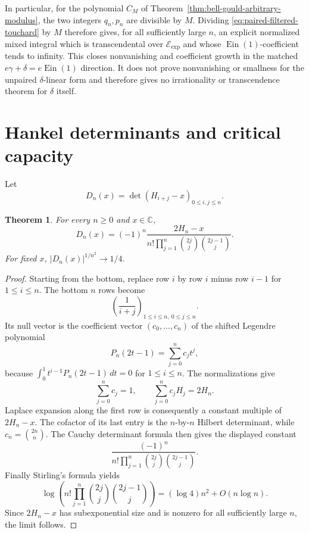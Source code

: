 \documentclass[11pt]{article}
\newtheorem{theorem}{Theorem}[section]
\theoremstyle{definition}
\theoremstyle{remark}
\newcommand{\C}{\mathbb C}
\newcommand{\Ein}{\operatorname{Ein}}
\newcommand{\Eexp}{\mathcal E_{\mathrm{exp}}}
\begin{document}
In particular, for the polynomial \(C_M\) of
Theorem~\ref{thm:bell-gould-arbitrary-modulus}, the two integers \(q_n,p_n\)
are divisible by \(M\).  Dividing
\eqref{eq:paired-filtered-touchard} by \(M\) therefore gives, for all
sufficiently large \(n\), an explicit normalized mixed integral which is
transcendental over \(\Eexp\) and whose \(\Ein(1)\)-coefficient tends to
infinity.  This closes nonvanishing and coefficient growth in the matched
\(e\gamma+\delta=e\Ein(1)\) direction.  It does not prove nonvanishing or
smallness for the unpaired \(\delta\)-linear form and therefore gives no
irrationality or transcendence theorem for \(\delta\) itself.

\section{Hankel determinants and critical capacity}

Let
\[
 D_n(x)=\det(H_{i+j}-x)_{0\le i,j\le n}.
\]

\begin{theorem}\label{thm:hankel}
For every \(n\ge0\) and \(x\in\C\),
\[
 D_n(x)=(-1)^n\frac{2H_n-x}
 {n!\displaystyle\prod_{j=1}^n\binom{2j}{j}\binom{2j-1}{j}}.
\]
For fixed \(x\), \( |D_n(x)|^{1/n^2}\to1/4\).
\end{theorem}

\begin{proof}
Starting from the bottom, replace row \(i\) by row \(i\) minus row \(i-1\)
for \(1\le i\le n\).  The bottom \(n\) rows become
\[
 \left(\frac1{i+j}\right)_{1\le i\le n,\ 0\le j\le n}.
\]
Its null vector is the coefficient vector \((c_0,\ldots,c_n)\) of the
shifted Legendre polynomial
\[
 P_n(2t-1)=\sum_{j=0}^nc_jt^j,
\]
because \(\int_0^1t^{i-1}P_n(2t-1)\,dt=0\) for \(1\le i\le n\).
The normalizations give
\[
 \sum_{j=0}^nc_j=1,\qquad
 \sum_{j=0}^nc_jH_j=2H_n.
\]
Laplace expansion along the first row is consequently a constant multiple of
\(2H_n-x\).  The cofactor of its last entry is the \(n\)-by-\(n\) Hilbert
determinant, while \(c_n=\binom{2n}{n}\).  The Cauchy determinant formula
then gives the displayed constant
\[
 \frac{(-1)^n}{n!\prod_{j=1}^n\binom{2j}{j}\binom{2j-1}{j}}.
\]
Finally Stirling's formula yields
\[
 \log\left(n!\prod_{j=1}^n\binom{2j}{j}\binom{2j-1}{j}\right)
 = (\log4)n^2+O(n\log n).
\]
Since \(2H_n-x\) has subexponential size and is nonzero for all sufficiently
large \(n\), the limit follows.
\end{proof}
\end{document}

